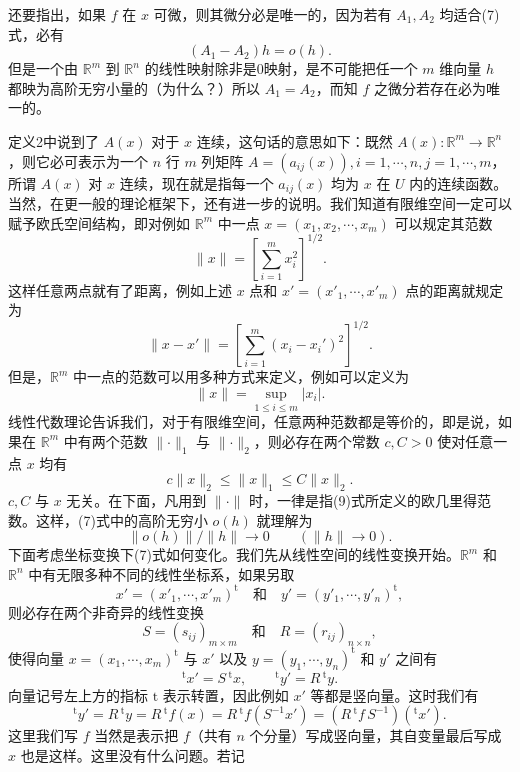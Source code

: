 还要指出，如果 $f$ 在 $x$ 可微，则其微分必是唯一的，因为若有 $A_1,A_2$ 均适合(7)式，必有
\[
 (A_1-A_2)h=o(h).
\]
但是一个由 $\mathbb R^m$ 到 $\mathbb R^n$ 的线性映射除非是0映射，是不可能把任一个 $m$ 维向量 $h$ 都映为高阶无穷小量的（为什么？）所以 $A_1=A_2$，而知 $f$ 之微分若存在必为唯一的。

定义2中说到了 $A(x)$ 对于 $x$ 连续，这句话的意思如下：既然 $A(x):\mathbb R^m\to\mathbb R^n$，则它必可表示为一个 $n$ 行 $m$ 列矩阵 $A=(a_{ij}(x)),i=1,\cdots,n,j=1,\cdots,m$，所谓 $A(x)$ 对 $x$ 连续，现在就是指每一个 $a_{ij}(x)$ 均为 $x$ 在 $U$ 内的连续函数。当然，在更一般的理论框架下，还有进一步的说明。我们知道有限维空间一定可以赋予欧氏空间结构，即对例如 $\mathbb R^m$ 中一点 $x=(x_1,x_2,\cdots,x_m)$ 可以规定其范数
\begin{equation}
 \lVert x\rVert=\left[\sum_{i=1}^m x_i^2\right]^{1/2}.
 \tag{9}
\end{equation}
这样任意两点就有了距离，例如上述 $x$ 点和 $x'=(x'_1,\cdots,x'_m)$ 点的距离就规定为
\[
 \lVert x-x'\rVert=\left[\sum_{i=1}^m(x_i-x_i')^2\right]^{1/2}.
\]
但是，$\mathbb R^m$ 中一点的范数可以用多种方式来定义，例如可以定义为
\begin{equation}
 \lVert x\rVert=\sup_{1\le i\le m}|x_i|.
 \tag{10}
\end{equation}
线性代数理论告诉我们，对于有限维空间，任意两种范数都是等价的，即是说，如果在 $\mathbb R^m$ 中有两个范数 $\lVert\cdot\rVert_1$ 与 $\lVert\cdot\rVert_2$，则必存在两个常数 $c,C>0$ 使对任意一点 $x$ 均有
\[
 c\lVert x\rVert_2\le\lVert x\rVert_1\le C\lVert x\rVert_2.
\]
$c,C$ 与 $x$ 无关。在下面，凡用到 $\lVert\cdot\rVert$ 时，一律是指(9)式所定义的欧几里得范数。这样，(7)式中的高阶无穷小 $o(h)$ 就理解为
\[
 \lVert o(h)\rVert/\lVert h\rVert\to0\qquad(\lVert h\rVert\to0).
\]
下面考虑坐标变换下(7)式如何变化。我们先从线性空间的线性变换开始。$\mathbb R^m$ 和 $\mathbb R^n$ 中有无限多种不同的线性坐标系，如果另取
\[
 x'=(x'_1,\cdots,x'_m)^{\mathrm t}\quad\text{和}\quad y'=(y'_1,\cdots,y'_n)^{\mathrm t},
\]
则必存在两个非奇异的线性变换
\[
 S=(s_{ij})_{m\times m}\quad\text{和}\quad R=(r_{ij})_{n\times n},
\]
使得向量 $x=(x_1,\cdots,x_m)^{\mathrm t}$ 与 $x'$ 以及 $y=(y_1,\cdots,y_n)^{\mathrm t}$ 和 $y'$ 之间有
\[
 {}^{\mathrm t}x'=S\,{}^{\mathrm t}x,\qquad {}^{\mathrm t}y'=R\,{}^{\mathrm t}y.
\]
向量记号左上方的指标 $\mathrm t$ 表示转置，因此例如 $x'$ 等都是竖向量。这时我们有
\[
 {}^{\mathrm t}y'=R\,{}^{\mathrm t}y=R\,{}^{\mathrm t}f(x)=R\,{}^{\mathrm t}f(S^{-1}x')=(R\,{}^{\mathrm t}f\,S^{-1})({}^{\mathrm t}x').
\]
这里我们写 $f$ 当然是表示把 $f$（共有 $n$ 个分量）写成竖向量，其自变量最后写成 $x$ 也是这样。这里没有什么问题。若记

